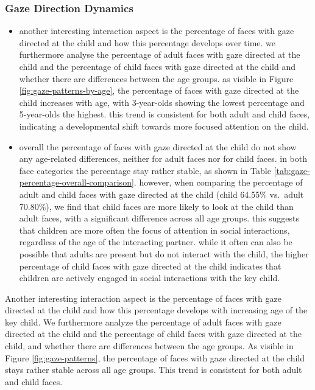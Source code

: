\documentclass[
  man,floatsintext]{apa6}
\providecommand{\tightlist}{%
  \setlength{\itemsep}{0pt}\setlength{\parskip}{0pt}}
\begin{document}
\subsubsection{Gaze Direction Dynamics}\label{gaze-direction-dynamics}

\begin{itemize}
\tightlist
\item
  another interesting interaction aspect is the percentage of faces with gaze directed at the child and how this percentage develops over time. we furthermore analyse the percentage of adult faces with gaze directed at the child and the percentage of child faces with gaze directed at the child and whether there are differences between the age groups. as visible in Figure \ref{fig:gaze-patterns-by-age}, the percentage of faces with gaze directed at the child increases with age, with 3-year-olds showing the lowest percentage and 5-year-olds the highest. this trend is consistent for both adult and child faces, indicating a developmental shift towards more focused attention on the child.
\item
  overall the percentage of faces with gaze directed at the child do not show any age-related differences, neither for adult faces nor for child faces. in both face categories the percentage stay rather stable, as shown in Table \ref{tab:gaze-percentage-overall-comparison}. however, when comparing the percentage of adult and child faces with gaze directed at the child (child 64.55\% vs.~adult 70.80\%), we find that child faces are more likely to look at the child than adult faces, with a significant difference across all age groups. this suggests that children are more often the focus of attention in social interactions, regardless of the age of the interacting partner. while it often can also be possible that adults are present but do not interact with the child, the higher percentage of child faces with gaze directed at the child indicates that children are actively engaged in social interactions with the key child.
\end{itemize}

Another interesting interaction aspect is the percentage of faces with gaze directed at the child and how this percentage develops with increasing age of the key child. We furthermore analyze the percentage of adult faces with gaze directed at the child and the percentage of child faces with gaze directed at the child, and whether there are differences between the age groups. As visible in Figure \ref{fig:gaze-patterns}, the percentage of faces with gaze directed at the child stays rather stable across all age groups. This trend is consistent for both adult and child faces.
\end{document}
